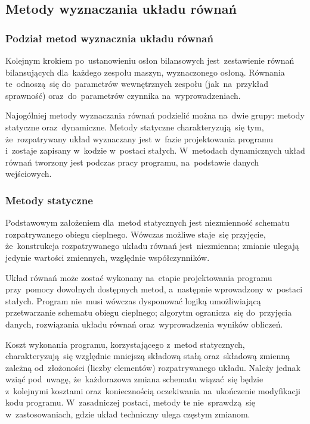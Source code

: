 \subsection{Metody wyznaczania układu równań}

\subsubsection{Podział metod wyznacznia układu równań}

Kolejnym krokiem po~ustanowieniu osłon bilansowych jest~zestawienie
równań bilansujących dla~każdego zespołu maszyn, wyznaczonego osłoną.
Równania te~odnoszą~się do~parametrów wewnętrznych zespołu
(jak~na~przykład sprawność) oraz~do~parametrów czynnika
na~wyprowadzeniach.

Najogólniej metody wyznaczania równań podzielić można na~dwie grupy:
metody statyczne oraz~dynamiczne. Metody statyczne charakteryzują~się
tym, że~rozpatrywany układ wyznaczany jest w~fazie projektowania
programu i~zostaje zapisany w~kodzie w~postaci stałych. W~metodach
dynamicznych układ równań tworzony jest podczas pracy programu,
na~podstawie danych wejściowych.


\subsubsection{Metody statyczne}

Podstawowym założeniem dla~metod statycznych jest niezmienność schematu
rozpatrywanego obiegu cieplnego. Wówczas możliwe staje~się przyjęcie,
że~konstrukcja rozpatrywanego układu równań jest~niezmienna; zmianie
ulegają jedynie wartości zmiennych, względnie współczynników.

Układ równań może zostać wykonany na~etapie projektowania programu
przy~pomocy dowolnych dostępnych metod, a~następnie wprowadzony
w~postaci stałych. Program nie~musi wówczas dysponować logiką
umożliwiającą przetwarzanie schematu obiegu cieplnego; algorytm
ogranicza~się do~przyjęcia danych, rozwiązania układu równań
oraz~wyprowadzenia wyników obliczeń.

Koszt wykonania programu, korzystającego z~metod statycznych,
charakteryzują~się względnie mniejszą składową stałą oraz~składową
zmienną zależną od~złożoności (liczby elementów) rozpatrywanego układu.
Należy jednak wziąć pod~uwagę, że~każdorazowa zmiana schematu wiązać~się
będzie z~kolejnymi kosztami oraz~koniecznością oczekiwania na~ukończenie
modyfikacji kodu programu. W~zasadniczej postaci, metody te
nie~sprawdzą~się w~zastosowaniach, gdzie układ techniczny ulega częstym
zmianom.

